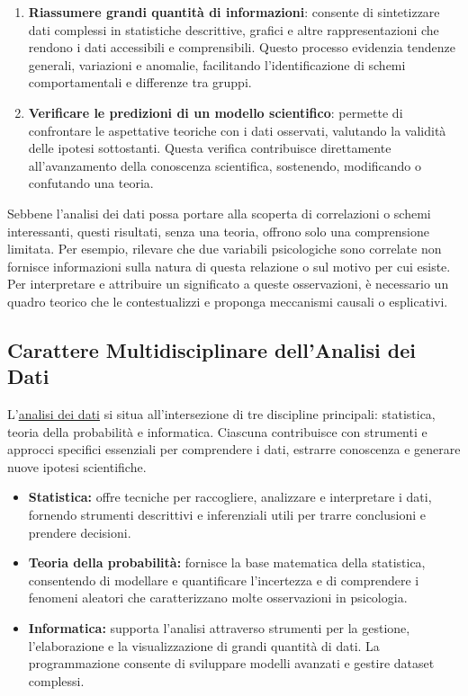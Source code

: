 \documentclass[
  letterpaper,
  DIV=11,
  numbers=noendperiod]{scrreprt}
\theoremstyle{definition}
\theoremstyle{remark}
\begin{document}
\begin{enumerate}
\def\labelenumi{\arabic{enumi}.}
\item
  \textbf{Riassumere grandi quantità di informazioni}: consente di
  sintetizzare dati complessi in statistiche descrittive, grafici e
  altre rappresentazioni che rendono i dati accessibili e comprensibili.
  Questo processo evidenzia tendenze generali, variazioni e anomalie,
  facilitando l'identificazione di schemi comportamentali e differenze
  tra gruppi.
\item
  \textbf{Verificare le predizioni di un modello scientifico}: permette
  di confrontare le aspettative teoriche con i dati osservati, valutando
  la validità delle ipotesi sottostanti. Questa verifica contribuisce
  direttamente all'avanzamento della conoscenza scientifica, sostenendo,
  modificando o confutando una teoria.
\end{enumerate}

Sebbene l'analisi dei dati possa portare alla scoperta di correlazioni o
schemi interessanti, questi risultati, senza una teoria, offrono solo
una comprensione limitata. Per esempio, rilevare che due variabili
psicologiche sono correlate non fornisce informazioni sulla natura di
questa relazione o sul motivo per cui esiste. Per interpretare e
attribuire un significato a queste osservazioni, è necessario un quadro
teorico che le contestualizzi e proponga meccanismi causali o
esplicativi.

\subsection{Carattere Multidisciplinare dell'Analisi dei
Dati}\label{carattere-multidisciplinare-dellanalisi-dei-dati}

L'\href{https://imstat.org/2014/09/04/data-science-how-is-it-different-to-statistics\%E2\%80\%89/}{analisi
dei dati} si situa all'intersezione di tre discipline principali:
statistica, teoria della probabilità e informatica. Ciascuna
contribuisce con strumenti e approcci specifici essenziali per
comprendere i dati, estrarre conoscenza e generare nuove ipotesi
scientifiche.

\begin{itemize}
\item
  \textbf{Statistica:} offre tecniche per raccogliere, analizzare e
  interpretare i dati, fornendo strumenti descrittivi e inferenziali
  utili per trarre conclusioni e prendere decisioni.
\item
  \textbf{Teoria della probabilità:} fornisce la base matematica della
  statistica, consentendo di modellare e quantificare l'incertezza e di
  comprendere i fenomeni aleatori che caratterizzano molte osservazioni
  in psicologia.
\item
  \textbf{Informatica:} supporta l'analisi attraverso strumenti per la
  gestione, l'elaborazione e la visualizzazione di grandi quantità di
  dati. La programmazione consente di sviluppare modelli avanzati e
  gestire dataset complessi.
\end{itemize}
\end{document}
